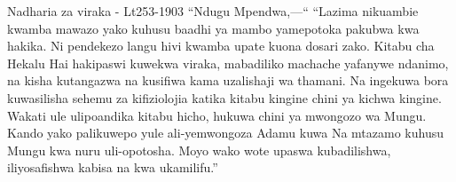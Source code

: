 


Nadharia za viraka - Lt253-1903
“Ndugu Mpendwa,—“
“Lazima nikuambie kwamba mawazo yako kuhusu baadhi ya mambo yamepotoka pakubwa kwa hakika. Ni pendekezo langu hivi kwamba upate kuona dosari zako. Kitabu cha Hekalu Hai hakipaswi kuwekwa viraka, mabadiliko machache yafanywe ndanimo, na kisha kutangazwa na kusifiwa kama uzalishaji wa thamani. Na ingekuwa bora kuwasilisha sehemu za kifiziolojia katika kitabu kingine chini ya kichwa kingine. Wakati ule ulipoandika kitabu hicho, hukuwa chini ya mwongozo wa Mungu. Kando yako palikuwepo yule ali-yemwongoza Adamu kuwa Na mtazamo kuhusu Mungu kwa nuru uli-opotosha. Moyo wako wote upaswa kubadilishwa, iliyosafishwa kabisa na kwa ukamilifu.”
